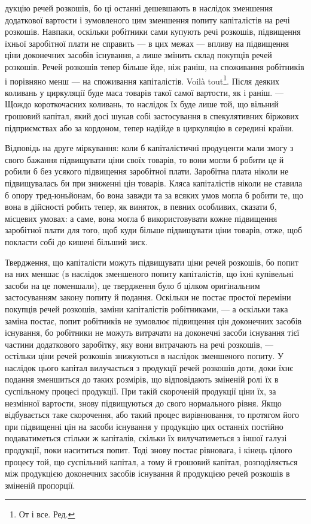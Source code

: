 дукцію речей розкошів, бо ці останні дешевшають в наслідок зменшення
додаткової вартости і зумовленого цим зменшення попиту капіталістів на
речі розкошів. Навпаки, оскільки робітники сами купують речі розкошів,
підвищення їхньої заробітної плати не справить — в цих межах — впливу на
підвищення ціни доконечних засобів існування, а лише змінить склад
покупців речей розкошів. Речей розкошів тепер більше йде, ніж раніш,
на споживання робітників і порівняно менш — на споживання капіталістів.
Voilà tout\footnote*{
От і все. Ред.
}. Після деяких коливань у циркуляції буде маса товарів такої
самої вартости, як і раніш. — Щождо короткочасних коливань, то наслідок
їх буде лише той, що вільний грошовий капітал, який досі шукав собі
застосування в спекулятивних біржових підприємствах або за кордоном,
тепер надійде в циркуляцію в середині країни.

Відповідь на друге міркування: коли б капіталістичні продуценти
мали змогу з свого бажання підвищувати ціни своїх товарів, то вони
могли б робити це й робили б без усякого підвищення заробітної плати.
Заробітна плата ніколи не підвищувалась би при зниженні цін товарів.
Кляса капіталістів ніколи не ставила б опору тред-юньйонам, бо вона
завжди та за всяких умов могла б робити те, що вона в дійсності робить
тепер, як виняток, в певних особливих, сказати б, місцевих умовах:
а саме, вона могла б використовувати кожне підвищення заробітної плати
для того, щоб куди більше підвищувати ціни товарів, отже, щоб покласти
собі до кишені більший зиск.

Твердження, що капіталісти можуть підвищувати ціни речей розкошів,
бо попит на них меншає (в наслідок зменшеного попиту капіталістів, що
їхні купівельні засоби на це поменшали), це твердження було б цілком
оригінальним застосуванням закону попиту й подання. Оскільки не постає
простої переміни покупців речей розкошів, заміни капіталістів робітниками, —
а оскільки така заміна постає, попит робітників не зумовлює підвищення
цін доконечних засобів існування, бо робітники не можуть витрачати на
доконечні засоби існування тієї частини додаткового заробітку, яку вони
витрачають на речі розкошів, — остільки ціни речей розкошів знижуються
в наслідок зменшеного попиту. У наслідок цього капітал вилучається з
продукції речей розкошів доти, доки їхнє подання зменшиться до таких
розмірів, що відповідають зміненій ролі їх в суспільному процесі продукції.
При такій скороченій продукції ціни їх, за незмінної вартости, знову
підвищуються до свого нормального рівня. Якщо відбувається таке
скорочення, або такий процес вирівнювання, то протягом його при підвищенні
цін на засоби існування у продукцію цих останніх постійно
подаватиметься стільки ж капіталів, скільки їх вилучатиметься з іншої
галузі продукції, поки насититься попит. Тоді знову постає рівновага, і
кінець цілого процесу той, що суспільний капітал, а тому й грошовий
капітал, розподіляється між продукцією доконечних засобів існування й
продукцією речей розкошів в зміненій пропорції.